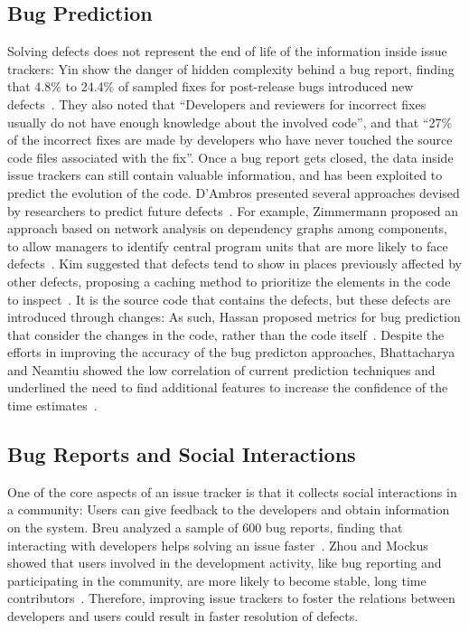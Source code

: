 


\subsection{Bug Prediction}

Solving defects does not represent the end of life of the information inside issue trackers: Yin \etal show the danger of hidden complexity behind a bug report, finding that 4.8\% to 24.4\% of sampled fixes for post-release bugs introduced new defects~\cite{Yin2011a}.
They also noted that ``Developers and reviewers for incorrect fixes usually do not have enough knowledge about the involved code'', and that ``27\% of the incorrect fixes are made by developers who have never touched the source code files associated with the fix''.
Once a bug report gets closed, the data inside issue trackers can still contain valuable information, and has been exploited to predict the evolution of the code.
D'Ambros \etal presented several approaches devised by researchers to predict future defects~\cite{DAmb2012a}.
For example, Zimmermann \etal proposed an approach based on network analysis on dependency graphs among components, to allow managers to identify central program units that are more likely to face defects~\cite{Zimm2008a}.
Kim \etal suggested that defects tend to show in places previously affected by other defects, proposing a caching method to prioritize the elements in the code to inspect~\cite{Kim2007a}.
It is the source code that contains the defects, but these defects are introduced through changes: As such, Hassan \etal proposed metrics for bug prediction that consider the changes in the code, rather than the code itself~\cite{Hass2009a}.
Despite the efforts in improving the accuracy of the bug predicton approaches, Bhattacharya and Neamtiu showed the low correlation of current prediction techniques and underlined the need to find additional features to increase the confidence of the time estimates~\cite{Bhat2011}.


\subsection{Bug Reports and Social Interactions}

One of the core aspects of an issue tracker is that it collects social interactions in a community: Users can give feedback to the developers and obtain information on the system.
Breu \etal analyzed a sample of 600 bug reports, finding that interacting with developers helps solving an issue faster~\cite{Breu2010}.
Zhou and Mockus showed that users involved in the development activity, like bug reporting and participating in the community, are more likely to become stable, long time contributors~\cite{Zhou2015}.
Therefore, improving issue trackers to foster the relations between developers and users could result in faster resolution of defects.


